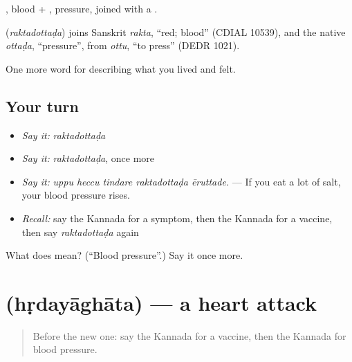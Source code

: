 , blood + , pressure, joined with a .

\begin{cousinweb}
\textbf{} (\emph{raktadottaḍa}) joins Sanskrit \emph{rakta}, \textquotedblleft{}red; blood\textquotedblright{} (CDIAL 10539), and the native \emph{ottaḍa}, \textquotedblleft{}pressure\textquotedblright{}, from \emph{ottu}, \textquotedblleft{}to press\textquotedblright{} (DEDR 1021).
\end{cousinweb}

\begin{grammarlens}[title={What you've built}]
One more word for describing what you lived and felt.
\end{grammarlens}

\subsection*{Your turn}
\begin{itemize}
\raggedright
  \item \emph{Say it:} \emph{raktadottaḍa}
  \item \emph{Say it:} \emph{raktadottaḍa}, once more
  \item \emph{Say it:} \emph{uppu heccu tindare raktadottaḍa ēruttade.} — If you eat a lot of salt, your blood pressure rises.
  \item \emph{Recall:} say the Kannada for a symptom, then the Kannada for a vaccine, then say \emph{raktadottaḍa} again
\end{itemize}

\begin{tcolorbox}[breakable,colback=teal!4,colframe=teal!35!black,title={Before you move on}]
What does  mean? (\textquotedblleft{}Blood pressure\textquotedblright{}.) Say it once more.
\end{tcolorbox}
\section[\texorpdfstring{\kn{ಹೃದಯಾಘಾತ} (hṛdayāghāta)}{ಹೃದಯಾಘಾತ (hṛdayāghāta)}]{ (hṛdayāghāta) — a heart attack}

\label{lesson:KA-C512-hrdayaghata}



\begin{quote}
Before the new one: say the Kannada for a vaccine, then the Kannada for blood pressure.
\end{quote}

